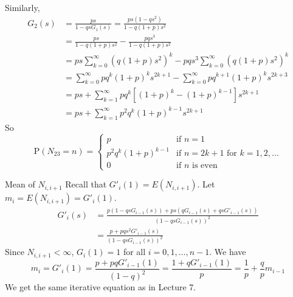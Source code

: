 \documentclass[letterpaper, mathserif]{beamer}
\def\p{\mathrm P}
\def\Sum{\sum\nolimits}
\begin{document}
\begin{frame}
Similarly,
\begin{align*}
G_2(s) &= \frac{ps}{1-qsG_1(s)}=\frac{ps(1-qs^2)}{1-q(1+p)s^2}\\
&=\frac{ps}{1-q(1+p)s^2}-\frac{pqs^3}{1-q(1+p)s^2}\\
&=ps\Sum_{k=0}^{\infty}(q(1+p)s^2)^k-pqs^3\Sum_{k=0}^{\infty}(q(1+p)s^2)^k\\
&=\Sum_{k=0}^{\infty}pq^k(1+p)^ks^{2k+1}-\Sum_{k=0}^{\infty}pq^{k+1}(1+p)^ks^{2k+3}\\
&=ps+ \Sum_{k=1}^{\infty}pq^k[(1+p)^{k}-(1+p)^{k-1}]s^{2k+1}\\
&=ps+ \Sum_{k=1}^{\infty}p^2q^k(1+p)^{k-1}s^{2k+1}
\end{align*}
So
$$
\p(N_{23}=n)
=\begin{cases}
p    & \text{if }n=1\\
p^2q^k(1\!+\!p)^{k-1} & \text{if $n=2k+1$ for } k=1,2,\ldots\\
0    & \text{if $n$ is even}
\end{cases}
$$
\end{frame}
\begin{frame}{Mean of $N_{i,i+1}$}
Recall that $G'_i(1)=E(N_{i,i+1})$. Let $m_i=E(N_{i,i+1})=G'_i(1)$.
\begin{align*}
G'_i(s)&=\frac{p(1-qsG_{i-1}(s))+ps(qG_{i-1}(s)+qsG'_{i-1}(s))}{(1-qsG_{i-1}(s))^2}\\
&=\frac{p+pqs^2G'_{i-1}(s)}{(1-qsG_{i-1}(s))^2}
\end{align*}
Since $N_{i,i+1}<\infty$, $G_i(1)=1$ for all $i=0,1,\ldots,n-1$.
We have
\[
m_i=G'_i(1)=\frac{p+pqG'_{i-1}(1)}{(1-q)^2}=\frac{1+qG'_{i-1}(1)}{p}=\frac{1}{p}+\frac{q}{p} m_{i-1}
\]
We get the same iterative equation as in Lecture 7.

\end{frame}
\end{document}

